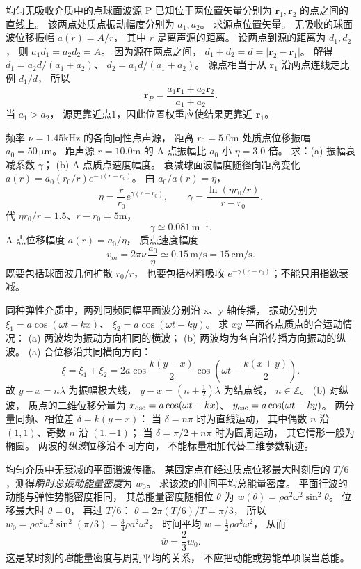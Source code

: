 均匀无吸收介质中的点球面波源 P
已知位于两位置矢量分别为
$\bm r_1,\bm r_2$ 的点之间的直线上。
该两点处质点振动幅度分别为 $a_1,a_2$。
求源点位置矢量。
\exsolution
无吸收的球面波位移振幅
$a(r)=A/r$，
其中 $r$ 是离声源的距离。
设两点到源的距离为 $d_1,d_2$，
则
$a_1d_1=a_2d_2=A$。
因为源在两点之间，
$d_1+d_2=d=|\bm r_2-\bm r_1|$。
解得
$d_1=a_2d/(a_1+a_2)$、
$d_2=a_1d/(a_1+a_2)$。
源点相当于从 $\bm r_1$ 沿两点连线走比例
$d_1/d$，
所以
\[
\boxed{\bm r_P=
\frac{a_1\bm r_1+a_2\bm r_2}{a_1+a_2}}.
\]
\excheck 当 $a_1>a_2$，
源更靠近点1，因此位置权重应使结果更靠近 $\bm r_1$。

频率 $\nu=1.45$kHz 的各向同性点声源，
距离 $r_0=5.0$m 处质点位移振幅
$a_0=50\,\mathrm{\mu m}$。
距声源 $r=10.0$m 的 A 点振幅比 $a_0$ 小
$\eta=3.0$ 倍。
求：(a) 振幅衰减系数 $\gamma$；
(b) A 点质点速度幅度。
\exsolution
衰减球面波幅度随径向距离变化
$a(r)=a_0(r_0/r)e^{-\gamma(r-r_0)}$。
由 $a_0/a(r)=\eta$，
\[
\eta=\frac r{r_0}e^{\gamma(r-r_0)},
\qquad
\boxed{\gamma=\frac{\ln(\eta r_0/r)}{r-r_0}}.
\]
代 $\eta r_0/r=1.5$、$r-r_0=5$m，
\[
\boxed{\gamma\simeq0.081\,\mathrm{m^{-1}}}.
\]
A 点位移幅度 $a(r)=a_0/\eta$，
质点速度幅度
\[
\boxed{v_m=2\pi\nu\,\frac{a_0}{\eta}
\simeq0.15\,\mathrm{m/s}=15\,\mathrm{cm/s}}.
\]
\excheck 既要包括球面波几何扩散 $r_0/r$，
也要包括材料吸收 $e^{-\gamma(r-r_0)}$；不能只用指数衰减。

同种弹性介质中，两列同频同幅平面波分别沿 x、y 轴传播，
振动分别为
$\xi_1=a\cos(\omega t-kx)$、
$\xi_2=a\cos(\omega t-ky)$。
求 $xy$ 平面各点质点的合运动情况：
(a) 两波均为振动方向相同的横波；
(b) 两波均为各自沿传播方向振动的纵波。
\exsolution
(a) 合位移沿共同横向方向：
\[
\xi=\xi_1+\xi_2
=2a\cos\frac{k(y-x)}2
\cos\left(\omega t-\frac{k(x+y)}2\right).
\]
故
$\boxed{y-x=n\lambda}$ 为振幅极大线，
$\boxed{y-x=(n+\tfrac12)\lambda}$ 为结点线，
$n\in\mathbb Z$。
(b) 对纵波，
质点的二维位移分量为
$x_{\rm osc}=a\cos(\omega t-kx)$、
$y_{\rm osc}=a\cos(\omega t-ky)$。
两分量同频、相位差
$\delta=k(y-x)$：
当 $\delta=n\pi$ 时为直线运动，
其中偶数 $n$ 沿 $(1,1)$、奇数 $n$ 沿 $(1,-1)$；
当 $\delta=\pi/2+n\pi$ 时为圆周运动，
其它情形一般为椭圆。
\excheck 两波的\emph{纵波}位移沿不同方向，
不能标量相加代替二维参数轨迹。

均匀介质中无衰减的平面谐波传播。
某固定点在经过质点位移最大时刻后的
$T/6$，测得\emph{瞬时总振动能量密度}为 $w_0$。
求该波的时间平均总能量密度。
\exsolution
平面行波的动能与弹性势能密度相同，
其总能量密度随相位
$\theta$ 为
$w(\theta)=\rho a^2\omega^2\sin^2\theta$。
位移最大时 $\theta=0$，
再过 $T/6$：
$\theta=2\pi(T/6)/T=\pi/3$，
所以
$w_0=\rho a^2\omega^2\sin^2(\pi/3)
=\frac34\rho a^2\omega^2$。
时间平均
$\overline w=\frac12\rho a^2\omega^2$，
从而
\[
\boxed{\overline w=\frac23w_0}.
\]
\excheck 这是某时刻的\emph{总}能量密度与周期平均的关系，
不应把动能或势能单项误当总能。

